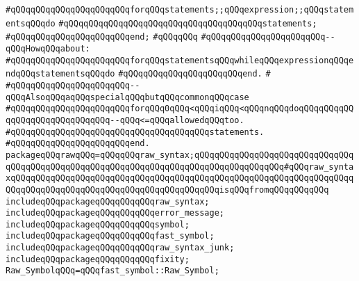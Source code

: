\verb|#qQQqqQQqqQQqqQQqqQQqqQQqforqQQqstatements;;qQQqexpression;;qQQqstatementsqQQqdo|\newline
\verb|#qQQqqQQqqQQqqQQqqQQqqQQqqQQqqQQqqQQqqQQqstatements;|\newline
\verb|#qQQqqQQqqQQqqQQqqQQqqQQqend;|\newline
\verb|#qQQqqQQq|\newline
\verb|#qQQqqQQqqQQqqQQqqQQqqQQq--qQQqHowqQQqabout:|\newline
\verb|#qQQqqQQqqQQqqQQqqQQqqQQqforqQQqstatementsqQQqwhileqQQqexpressionqQQqendqQQqstatementsqQQqdo|\newline
\verb|#qQQqqQQqqQQqqQQqqQQqqQQqend.|\newline
\verb|#|\newline
\verb|#qQQqqQQqqQQqqQQqqQQqqQQq--qQQqAlsoqQQqaqQQqspecialqQQqbutqQQqcommonqQQqcase|\newline
\verb|#qQQqqQQqqQQqqQQqqQQqqQQqforqQQq0qQQq<qQQqiqQQq<qQQqnqQQqdoqQQqqQQqqQQqqQQqqQQqqQQqqQQqqQQq--qQQq<=qQQqallowedqQQqtoo.|\newline
\verb|#qQQqqQQqqQQqqQQqqQQqqQQqqQQqqQQqqQQqqQQqstatements.|\newline
\verb|#qQQqqQQqqQQqqQQqqQQqqQQqend.|\newline
\newline
\newline
\newline
\verb|packageqQQqrawqQQq=qQQqqQQqraw_syntax;qQQqqQQqqQQqqQQqqQQqqQQqqQQqqQQqqQQqqQQqqQQqqQQqqQQqqQQqqQQqqQQqqQQqqQQqqQQqqQQqqQQqqQQq#qQQqraw_syntaxqQQqqQQqqQQqqQQqqQQqqQQqqQQqqQQqqQQqqQQqqQQqqQQqqQQqqQQqqQQqqQQqqQQqqQQqqQQqqQQqqQQqqQQqqQQqqQQqqQQqqQQqqQQqqQQqisqQQqfromqQQqqQQqqQQq|\newline
\newline
\verb|includeqQQqpackageqQQqqQQqqQQqraw_syntax;|\newline
\verb|includeqQQqpackageqQQqqQQqqQQqerror_message;|\newline
\verb|includeqQQqpackageqQQqqQQqqQQqsymbol;|\newline
\verb|includeqQQqpackageqQQqqQQqqQQqfast_symbol;|\newline
\verb|includeqQQqpackageqQQqqQQqqQQqraw_syntax_junk;|\newline
\verb|includeqQQqpackageqQQqqQQqqQQqfixity;|\newline
\newline
\verb|Raw_SymbolqQQq=qQQqfast_symbol::Raw_Symbol;|\newline
